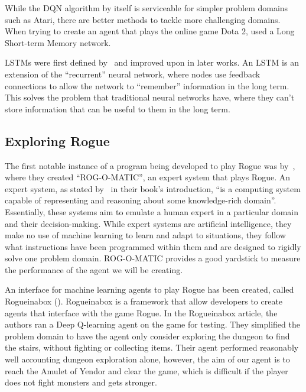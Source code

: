 \documentclass[11pt,a4paper]{article}
\begin{document}
    While the DQN algorithm by itself is serviceable for simpler problem domains such as Atari, there are better methods to tackle more challenging domains.
    When trying to create an agent that plays the online game Dota 2, \cite{berner19} used a Long Short-term Memory network.

    LSTMs were first defined by~\cite{hochreiter97} and improved upon in later works.
    An LSTM is an extension of the ``recurrent'' neural network, where nodes use feedback connections to allow the network to ``remember'' information in the long term.
    This solves the problem that traditional neural networks have, where they can't store information that can be useful to them in the long term.

    \subsection{Exploring Rogue}
    The first notable instance of a program being developed to play Rogue was by~\cite{mauldin83}, where they created ``ROG-O-MATIC'', an expert system that plays Rogue.
    An expert system, as stated by~\cite{jackson86} in their book's introduction, ``is a computing system capable of representing and reasoning about some knowledge-rich domain''.
    Essentially, these systems aim to emulate a human expert in a particular domain and their decision-making.
    While expert systems are artificial intelligence, they make no use of machine learning to learn and adapt to situations, they follow what instructions have been programmed within them and are designed to rigidly solve one problem domain.
    ROG-O-MATIC provides a good yardstick to measure the performance of the agent we will be creating.

    An interface for machine learning agents to play Rogue has been created, called Rogueinabox (\cite{asperti17}).
    Rogueinabox is a framework that allow developers to create agents that interface with the game Rogue.
    In the Rogueinabox article, the authors ran a Deep Q-learning agent on the game for testing.
    They simplified the problem domain to have the agent only consider exploring the dungeon to find the stairs, without fighting or collecting items.
    Their agent performed reasonably well accounting dungeon exploration alone, however, the aim of our agent is to reach the Amulet of Yendor and clear the game, which is difficult if the player does not fight monsters and gets stronger.
\end{document}
